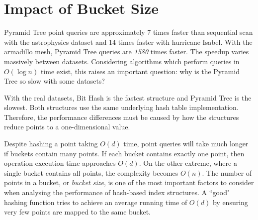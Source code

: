 \section{Impact of Bucket Size}

Pyramid Tree point queries are approximately 7 times faster than sequential scan with the astrophysics dataset and 14 times faster with hurricane Isabel. With the armadillo mesh, Pyramid Tree queries are \textit{1580} times faster. The speedup varies massively between datasets. Considering algorithms which perform queries in $O(\log n)$ time exist, this raises an important question: why is the Pyramid Tree so slow with some datasets?

With the real datasets, Bit Hash is the fastest structure and Pyramid Tree is the slowest. Both structures use the same underlying hash table implementation. Therefore, the performance differences must be caused by how the structures reduce points to a one-dimensional value. 

Despite hashing a point taking $O(d)$ time, point queries will take much longer if buckets contain many points. If each bucket contains exactly one point, then operation execution time approaches $O(d)$. On the other extreme, where a single bucket contains all points, the complexity becomes $O(n)$. The number of points in a bucket, or \textit{bucket size}, is one of the most important factors to consider when analysing the performance of hash-based index structures. A ``good" hashing function tries to achieve an average running time of $O(d)$ by ensuring very few points are mapped to the same bucket.


